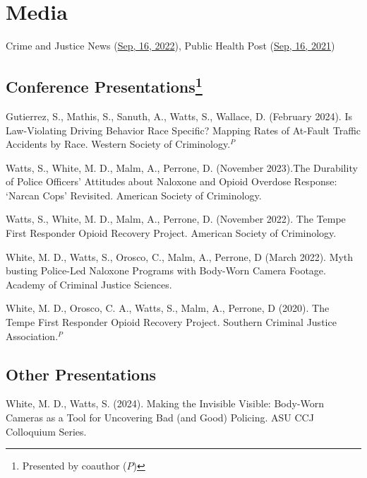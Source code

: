\documentclass[11pt,]{article}
\begin{document}
\hypertarget{media}{%
\section{Media}\label{media}}

Crime and Justice News
(\href{https://www.ncja.org/crimeandjusticenews/research-backs-police-response-to-drug-overdoses}{Sep,
16, 2022}), Public Health Post
(\href{https://www.publichealthpost.org/research/tempe-opioid-recovery/}{Sep,
16, 2021})

\vspace{2mm}

\hypertarget{conference-presentations}{%
\subsection[Conference Presentations]{\texorpdfstring{Conference
Presentations\footnote{Presented by coauthor (\(P\))}}{Conference Presentations}}\label{conference-presentations}}

Gutierrez, S., Mathis, S., Sanuth, A., Watts, S., Wallace, D. (February
2024). Is Law-Violating Driving Behavior Race Specific? Mapping Rates of
At-Fault Traffic Accidents by Race. Western Society of
Criminology.\(^P\)

Watts, S., White, M. D., Malm, A., Perrone, D. (November 2023).The
Durability of Police Officers' Attitudes about Naloxone and Opioid
Overdose Response: `Narcan Cops' Revisited. American Society of
Criminology.

Watts, S., White, M. D., Malm, A., Perrone, D. (November 2022). The
Tempe First Responder Opioid Recovery Project. American Society of
Criminology.

White, M. D., Watts, S., Orosco, C., Malm, A., Perrone, D (March 2022).
Myth busting Police-Led Naloxone Programs with Body-Worn Camera Footage.
Academy of Criminal Justice Sciences.

White, M. D., Orosco, C. A., Watts, S., Malm, A., Perrone, D (2020). The
Tempe First Responder Opioid Recovery Project. Southern Criminal Justice
Association.\(^P\)

\vspace{2mm}

\hypertarget{other-presentations}{%
\subsection{Other Presentations}\label{other-presentations}}

White, M. D., Watts, S. (2024). Making the Invisible Visible: Body-Worn
Cameras as a Tool for Uncovering Bad (and Good) Policing. ASU CCJ
Colloquium Series.
\end{document}
